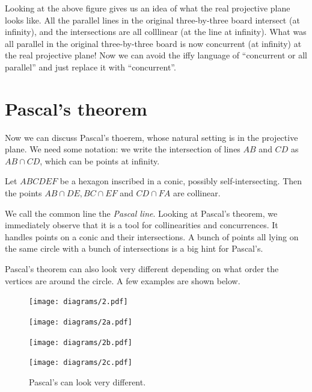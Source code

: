 \documentclass[11pt,paper=letter]{scrartcl}
\begin{document}
Looking at the above figure gives us an idea of what the real projective plane looks like. All the parallel lines in the original three-by-three board intersect (at infinity), and the intersections are all colllinear (at the line at infinity). What was all parallel in the original three-by-three board is now concurrent (at infinity) at the real projective plane! Now we can avoid the iffy language of ``concurrent or all parallel'' and just replace it with ``concurrent''.

\section{Pascal's theorem}

Now we can discuss Pascal's thoerem, whose natural setting is in the projective plane. We need some notation: we write the intersection of lines $AB$ and $CD$ as $AB \cap CD$, which can be points at infinity.

\begin{theorem*}
Let $ABCDEF$ be a hexagon inscribed in a conic, possibly self-intersecting. Then the points $AB \cap DE, BC \cap EF$ and $CD \cap FA$ are collinear.
\end{theorem*}

We call the common line the \emph{Pascal line}. Looking at Pascal's theorem, we immediately observe that it is a tool for collinearities and concurrences. It handles points on a conic and their intersections. A bunch of points all lying on the same circle with a bunch of intersections is a big hint for Pascal's.

Pascal's theorem can also look very different depending on what order the vertices are around the circle. A few examples are shown below.

\begin{figure}
  \centering
    \begin{minipage}{0.33\textwidth}
    \centering
    \texttt{[image: diagrams/2.pdf]}
    \end{minipage}
    \begin{minipage}{0.33\textwidth}
    \centering
    \texttt{[image: diagrams/2a.pdf]}
    \end{minipage}
    \begin{minipage}{0.33\textwidth}
    \centering
    \texttt{[image: diagrams/2b.pdf]}
    \end{minipage}
    \begin{minipage}{0.33\textwidth}
    \centering
    \texttt{[image: diagrams/2c.pdf]}
    \end{minipage}
  \caption{Pascal's can look very different.}
\end{figure}
\end{document}
